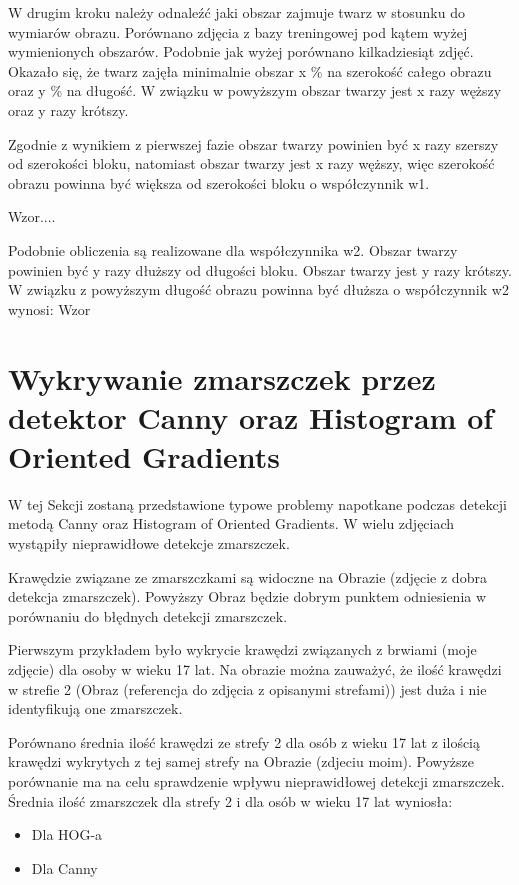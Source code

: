 \documentclass[a4paper,twoside,12pt]{book}
\begin{document}
    W drugim kroku należy odnaleźć jaki obszar zajmuje twarz w stosunku do wymiarów obrazu.
    Porównano zdjęcia z bazy treningowej pod kątem wyżej wymienionych obszarów. Podobnie jak wyżej porównano
    kilkadziesiąt zdjęć.
    Okazało się, że twarz zajęła minimalnie obszar x \% na szerokość całego obrazu oraz y \% na długość.
    W związku w powyższym obszar twarzy jest x razy węższy oraz y razy krótszy.

    Zgodnie z wynikiem z pierwszej fazie obszar twarzy powinien być x razy szerszy od szerokości bloku, natomiast obszar twarzy jest x razy węższy,
    więc szerokość obrazu powinna być większa od szerokości bloku o współczynnik w1.

    Wzor....

    Podobnie obliczenia są realizowane dla współczynnika w2. Obszar twarzy powinien być y razy dłuższy od długości bloku. Obszar twarzy jest y razy krótszy.
    W związku z powyższym długość obrazu powinna być dłuższa o współczynnik w2 wynosi:
    Wzor



    \section{Wykrywanie zmarszczek przez detektor Canny oraz Histogram of Oriented Gradients}\label{sec:wykrywanie-krawędzi-przez-detektor-canny}
    W tej Sekcji zostaną przedstawione typowe problemy napotkane podczas detekcji metodą Canny oraz Histogram of Oriented Gradients.
    W wielu zdjęciach wystąpiły nieprawidłowe detekcje zmarszczek.

    Krawędzie związane ze zmarszczkami są widoczne na Obrazie (zdjęcie z dobra detekcja zmarszczek).
    Powyższy Obraz będzie dobrym punktem odniesienia w porównaniu do błędnych detekcji zmarszczek.

    Pierwszym przykładem było wykrycie krawędzi związanych z brwiami (moje zdjęcie) dla osoby w wieku 17 lat.
    Na obrazie można zauważyć, że ilość krawędzi w strefie 2 (Obraz (referencja do zdjęcia z opisanymi strefami))
    jest duża i nie identyfikują one zmarszczek.

    Porównano średnia ilość krawędzi ze strefy 2 dla osób z wieku 17 lat z ilością krawędzi wykrytych z tej samej
    strefy na Obrazie (zdjeciu moim).
    Powyższe porównanie ma na celu sprawdzenie wpływu nieprawidłowej detekcji zmarszczek.
    Średnia ilość zmarszczek dla strefy 2 i dla osób w wieku 17 lat wyniosła:
    \begin{itemize}
        \item Dla HOG-a %
        \item Dla Canny
    \end{itemize}
\end{document}
